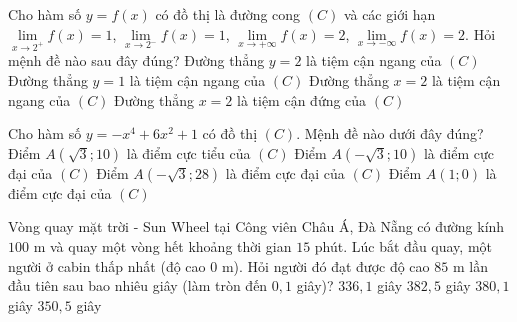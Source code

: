 \begin{ex}%
Cho hàm số $y=f(x)$ có đồ thị là đường cong $(C)$ và các giới hạn $\lim\limits_{x\to 2^{+}}f(x)=1$, $\lim\limits_{x\to 2^{-}}f(x)=1$, $\lim\limits_{x\to +\infty}f(x)=2$, $\lim\limits_{x\to -\infty}f(x)=2$. Hỏi mệnh đề nào sau đây đúng?
\choice
{\True Đường thẳng $y=2$ là tiệm cận ngang của $(C)$}
{Đường thẳng $y=1$ là tiệm cận ngang của $(C)$}
{Đường thẳng $x=2$ là tiệm cận ngang của $(C)$}
{Đường thẳng $x=2$ là tiệm cận đứng của $(C)$}
\end{ex}
\begin{ex}%
Cho hàm số $y=-x^{4}+6x^{2}+1$ có đồ thị $(C)$. Mệnh đề nào dưới đây đúng?
\choice
{Điểm $A(\sqrt{3};10)$ là điểm cực tiểu của $(C)$}
{\True Điểm $A(-\sqrt{3};10)$ là điểm cực đại của $(C)$}
{Điểm $A(-\sqrt{3};28)$ là điểm cực đại của $(C)$}
{Điểm $A(1;0)$ là điểm cực đại của $(C)$}
\end{ex}
\begin{ex}%
Vòng quay mặt trời - Sun Wheel tại Công viên Châu Á, Đà Nẵng có đường kính $100$ m và quay một vòng hết khoảng thời gian $15$ phút. Lúc bắt đầu quay, một người ở cabin thấp nhất (độ cao $0$ m). Hỏi người đó đạt được độ cao $85$ m lần đầu tiên sau bao nhiêu giây (làm tròn đến $0{,}1$ giây)?
\choice
{\True $336{,}1$ giây}
{$382{,}5$ giây}
{$380{,}1$ giây}
{$350{,}5$ giây}
\end{ex}

